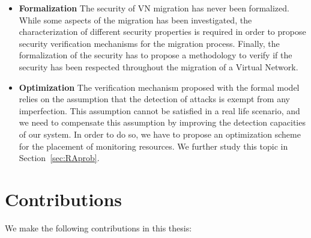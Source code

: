 \begin{itemize}
    \item \textbf{Formalization } The security of VN migration has never been formalized. While some aspects of the migration has been investigated, the characterization of different security properties is required in order to propose security verification mechanisms for the migration process.
    Finally, the formalization of the security has to propose a methodology to verify if the security has been respected throughout the migration of a Virtual Network. 

    \item \textbf{Optimization} The verification mechanism proposed with the formal model relies on the assumption that the detection of attacks is exempt from any imperfection. This assumption cannot be satisfied in a real life scenario, and we need to compensate this assumption by improving the detection capacities of our system.
    In order to do so, we have to propose an optimization scheme for the placement of monitoring resources.
    We further study this topic in Section~\ref{sec:RAprob}.
    
    
\end{itemize}

\newpage
\section{Contributions}
We make the following contributions in this thesis:

